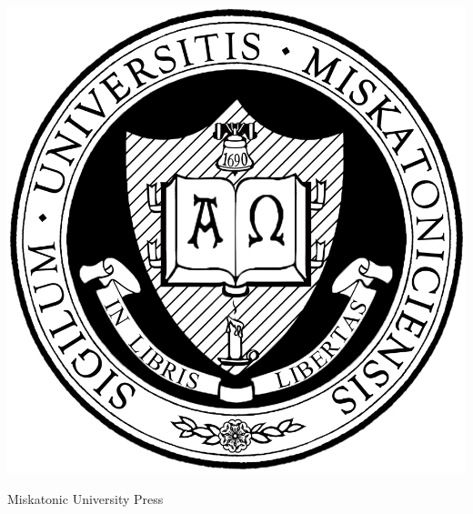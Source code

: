 \begin{titlepage}
\begin{center}
{} \\
\vspace{0.5cm}
\Large\textbf{\pdftitle} \\
\setmainfont{Times New Roman}
\large\pdfauthor

\vfill

\includegraphics[scale=.2]{miskatonic-university.jpg}

\vfill

\Large
Miskatonic University Press
\end{center}

\clearpage
\hspace{1pt}
\vfill


\end{titlepage}
